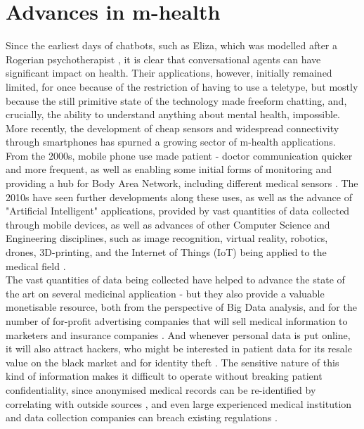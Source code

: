 \section{Advances in m-health}
Since the earliest days of chatbots, such as Eliza, which was modelled after a Rogerian psychotherapist \cite{weizenbaum1966eliza}, it is clear that conversational agents can have significant impact on health. Their applications, however, initially remained limited, for once because of the restriction of having to use a teletype, but mostly because the still primitive state of the technology made freeform chatting, and, crucially, the ability to understand anything about mental health, impossible. \\
More recently, the development of cheap sensors and widespread connectivity through smartphones has spurned a growing sector of m-health applications. From the 2000s, mobile phone use made patient - doctor communication quicker and more frequent, as well as enabling some initial forms of monitoring and providing a hub for Body Area Network, including different medical sensors \cite{Patrick2008}. The 2010s have seen further developments along these uses, as well as the advance of "Artificial Intelligent" applications, provided by vast quantities of data collected through mobile devices, as well as advances of other Computer Science and Engineering disciplines, such as image recognition, virtual reality, robotics, drones, 3D-printing, and the Internet of Things (IoT) being applied to the medical field \cite{Pistorius2017}. \\
The vast quantities of data being collected have helped to advance the state of the art on several medicinal application - but they also provide a valuable monetisable resource, both from the perspective of Big Data analysis, and for the number of for-profit advertising companies that will sell medical information to marketers and insurance companies \cite{tanner2016}. And whenever personal data is put online, it will also attract hackers, who might be interested in patient data for its resale value on the black market and for identity theft \cite{hackercare}. The sensitive nature of this kind of information makes it difficult to operate without breaking patient confidentiality, since anonymised medical records can be re-identified by correlating with outside sources \cite{Sweeney2001}, and even large experienced medical institution and data collection companies can breach existing regulations \cite{deepmindnhs}. 
